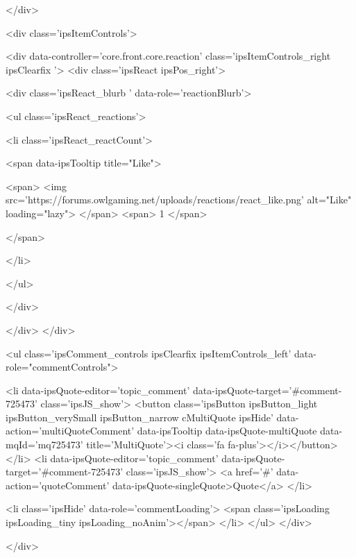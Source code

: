 			
		</div>

		
			<div class='ipsItemControls'>
				
					
						

	<div data-controller='core.front.core.reaction' class='ipsItemControls_right ipsClearfix '>	
		<div class='ipsReact ipsPos_right'>
			
				
				<div class='ipsReact_blurb ' data-role='reactionBlurb'>
					
						

	
	<ul class='ipsReact_reactions'>
		
		
			
				
				<li class='ipsReact_reactCount'>
					
						<span data-ipsTooltip title="Like">
					
							<span>
								<img src='https://forums.owlgaming.net/uploads/reactions/react_like.png' alt="Like" loading="lazy">
							</span>
							<span>
								1
							</span>
					
						</span>
					
				</li>
			
		
	</ul>

					
				</div>
			
			
			
		</div>
	</div>

					
				
				<ul class='ipsComment_controls ipsClearfix ipsItemControls_left' data-role="commentControls">
					
						
							<li data-ipsQuote-editor='topic_comment' data-ipsQuote-target='#comment-725473' class='ipsJS_show'>
								<button class='ipsButton ipsButton_light ipsButton_verySmall ipsButton_narrow cMultiQuote ipsHide' data-action='multiQuoteComment' data-ipsTooltip data-ipsQuote-multiQuote data-mqId='mq725473' title='MultiQuote'><i class='fa fa-plus'></i></button>
							</li>
							<li data-ipsQuote-editor='topic_comment' data-ipsQuote-target='#comment-725473' class='ipsJS_show'>
								<a href='#' data-action='quoteComment' data-ipsQuote-singleQuote>Quote</a>
							</li>
						
						
						
					
					<li class='ipsHide' data-role='commentLoading'>
						<span class='ipsLoading ipsLoading_tiny ipsLoading_noAnim'></span>
					</li>
				</ul>
			</div>
		

		
			

		
	</div>

